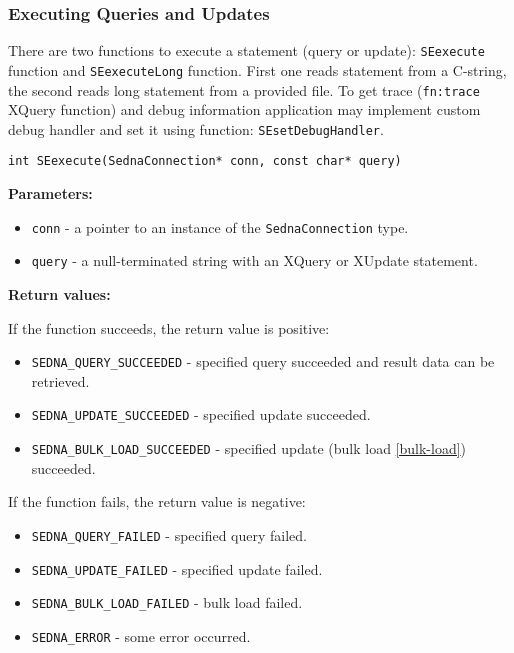 \documentclass[a4paper,12pt]{article}
\newenvironment{citemize}
{\begin{itemize}
  \setlength{\itemsep}{0pt}
  \setlength{\parskip}{0pt}
  \setlength{\parsep}{0pt}}
{\end{itemize}}
\begin{document}
\subsubsection{Executing Queries and Updates}
\label{exec-capi}

There are two functions to execute a statement (query or update):
\verb!SEexecute! function and \verb!SEexecuteLong! function. First one reads
statement from a C-string, the second reads long statement from a provided file.
To get trace (\verb!fn:trace! XQuery function) and debug information application
may implement custom debug handler and set it using function:
\verb!SEsetDebugHandler!.

\begin{verbatim}
int SEexecute(SednaConnection* conn, const char* query)
\end{verbatim}

\noindent
\textbf{Parameters:}

\begin{citemize}
\item\verb!conn! - a pointer to an instance of the \verb!SednaConnection! type.
\item\verb!query! - a null-terminated string with an XQuery or XUpdate
statement.
\end{citemize}

\noindent
\textbf{Return values:}

\medskip

\noindent
If the function succeeds, the return value is positive:

\begin{citemize}
\item\verb!SEDNA_QUERY_SUCCEEDED! - specified query succeeded and result data
can be retrieved.
\item\verb!SEDNA_UPDATE_SUCCEEDED! - specified update succeeded.
\item\verb!SEDNA_BULK_LOAD_SUCCEEDED! - specified update (bulk load
\ref{bulk-load}) succeeded.
\end{citemize}

\noindent
If the function fails, the return value is negative:

\begin{citemize}
\item\verb!SEDNA_QUERY_FAILED! - specified query failed.
\item\verb!SEDNA_UPDATE_FAILED! - specified update failed.
\item\verb!SEDNA_BULK_LOAD_FAILED! - bulk load failed.
\item\verb!SEDNA_ERROR! - some error occurred.
\end{citemize}
\end{document}
